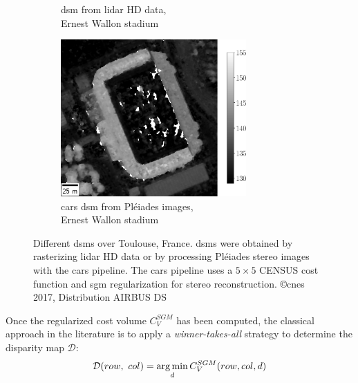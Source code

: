 \begin{figure}
\begin{subfigure}[t]{0.5\linewidth}
        \caption{\acrshort{dsm} from \acrshort{lidar} HD data,\\Ernest Wallon stadium}
        \label{fig:DSM_ernest_wallon_lidar}
    \end{subfigure}\hfill
    \begin{subfigure}[t]{0.5\linewidth}
        \centering
        \includegraphics[height=6cm]{Images/Chap_1/DSM_Wallon_CARS.png}
        \caption{\acrshort{cars} \acrshort{dsm} from Pléiades images,\\Ernest Wallon stadium}
        \label{fig:DSM_ernest_wallon_cars}
    \end{subfigure}
    \caption{Different \acrshort{dsm}s over Toulouse, France. \acrshort{dsm}s were obtained by rasterizing \acrshort{lidar} HD data or by processing Pléiades stereo images with the \acrshort{cars} pipeline. The \acrshort{cars} pipeline uses a $5\times5$ CENSUS cost function and \acrshort{sgm} regularization for stereo reconstruction. \copyright \acrshort{cnes} 2017, Distribution AIRBUS DS}
    \label{fig:DSM_toulouse}
\end{figure}

Once the regularized cost volume $C_V^{SGM}$ has been computed, the classical approach in the literature is to apply a \textit{winner-takes-all} strategy to determine the disparity map $\mathcal{D}$:
\begin{align}
    \mathcal{D}(row, ~col) = \operatorname*{arg\,min}_d C_V^{SGM}(row, col, d) 
\end{align}

